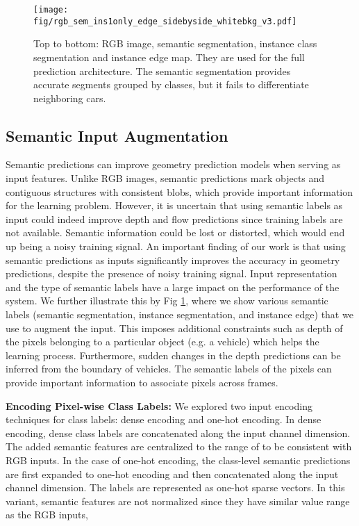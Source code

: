 \documentclass[10pt,twocolumn]{article}
\newcommand{\Noindent}{\vspace{2pt} \noindent}
\newcommand{\partitle}[1]{\Noindent\textbf{#1: }}
\begin{document}
\begin{figure}
    \centering
    \texttt{[image: fig/rgb\_sem\_ins1only\_edge\_sidebyside\_whitebkg\_v3.pdf]}
    \caption{Top to bottom: RGB image, semantic segmentation,  instance class segmentation and instance edge map. They are used for the full prediction architecture. The semantic segmentation provides accurate segments grouped by classes, but it fails to differentiate neighboring cars. }
    \label{fig:sem_side_by_side}
\end{figure}

\subsection{Semantic Input Augmentation}
\label{sec:sem_input}
Semantic predictions can improve geometry prediction models when serving as input features. Unlike RGB images, semantic predictions mark objects and contiguous structures with consistent blobs, which provide important information for the learning problem. However, it is uncertain that using semantic labels as input could indeed improve depth and flow predictions since training labels are not available. Semantic information could be lost or distorted, which would end up being a noisy training signal. An important finding of our work is that using semantic predictions as inputs significantly improves the accuracy in geometry predictions, despite the presence of noisy training signal. Input representation and the type of semantic labels have a large impact on the performance of the system. We further illustrate this by Fig \ref{fig:sem_side_by_side}, where we show various semantic labels (semantic segmentation, instance segmentation, and instance edge) that we use to augment the input. This imposes additional constraints such as depth of the pixels belonging to a particular object (e.g. a vehicle) which helps the learning process. Furthermore, sudden changes in the depth predictions can be inferred from the boundary of vehicles. The semantic labels of the pixels can provide important information to associate pixels across frames.

\partitle{Encoding Pixel-wise Class Labels}We explored two input encoding techniques for class labels: dense encoding and one-hot encoding. In dense encoding, dense class labels are concatenated along the input channel dimension. The added semantic features are centralized to the range of  to be consistent with RGB inputs.  In the case of one-hot encoding, the class-level semantic predictions are first expanded to one-hot encoding and then concatenated along the input channel dimension. The labels are represented as one-hot sparse vectors. In this variant, semantic features are not normalized since they have similar value range as the RGB inputs, 
\end{document}
